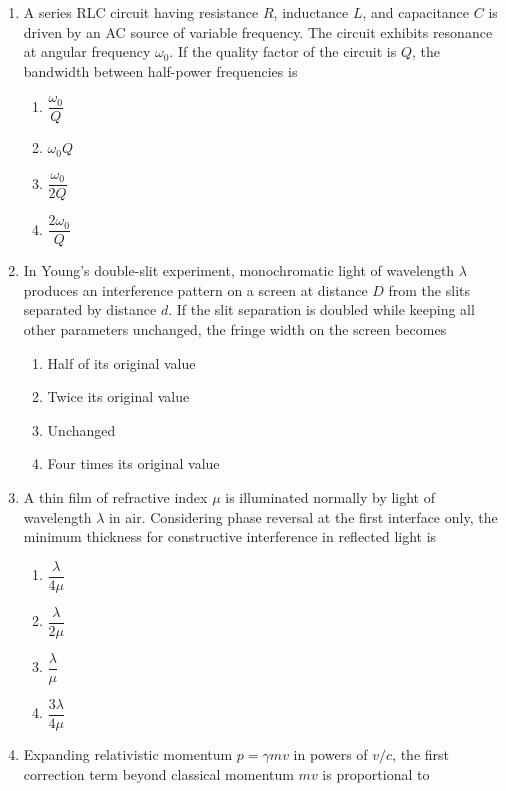 \documentclass[12pt]{article}
\begin{document}
\begin{enumerate}[leftmargin=*]
\item A series RLC circuit having resistance $R$, inductance $L$, and capacitance $C$ is driven by an AC source of variable frequency. The circuit exhibits resonance at angular frequency $\omega_0$. If the quality factor of the circuit is $Q$, the bandwidth between half-power frequencies is

\begin{enumerate}
\item $\dfrac{\omega_0}{Q}$
\item $\omega_0 Q$
\item $\dfrac{\omega_0}{2Q}$
\item $\dfrac{2\omega_0}{Q}$
\end{enumerate}

\item In Young’s double-slit experiment, monochromatic light of wavelength $\lambda$ produces an interference pattern on a screen at distance $D$ from the slits separated by distance $d$. If the slit separation is doubled while keeping all other parameters unchanged, the fringe width on the screen becomes

\begin{enumerate}
\item Half of its original value
\item Twice its original value
\item Unchanged
\item Four times its original value
\end{enumerate}

\item A thin film of refractive index $\mu$ is illuminated normally by light of wavelength $\lambda$ in air. Considering phase reversal at the first interface only, the minimum thickness for constructive interference in reflected light is

\begin{enumerate}
\item $\dfrac{\lambda}{4\mu}$
\item $\dfrac{\lambda}{2\mu}$
\item $\dfrac{\lambda}{\mu}$
\item $\dfrac{3\lambda}{4\mu}$
\end{enumerate}

\item Expanding relativistic momentum $p=\gamma mv$ in powers of $v/c$, the first correction term beyond classical momentum $mv$ is proportional to


\end{enumerate}
\end{document}
